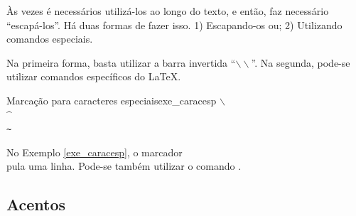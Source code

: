 
Às vezes é necessários utilizá-los ao longo do texto, e então, faz necessário ``escapá-los''. Há duas formas de fazer isso. 1) Escapando-os ou; 2) Utilizando comandos especiais.

Na primeira forma, basta utilizar a barra invertida ``$\backslash\backslash$''. Na segunda, pode-se utilizar comandos específicos do \LaTeX{}. 

%

\begin{texexptitled}[breakable,center lower,enhanced,middle=2mm,listing side text]{Marcação para caracteres especiais}{exe_caracesp}
$\backslash$ \\
\^{} \\
\texttt{\~{}}
\end{texexptitled}

\begin{marker}
  No Exemplo \ref{exe_caracesp}, o marcador \texttt{\\} pula uma linha. Pode-se também utilizar o comando \texttt{\newline}.
\end{marker}

\subsection{Acentos}
\label{sec:acentos}

